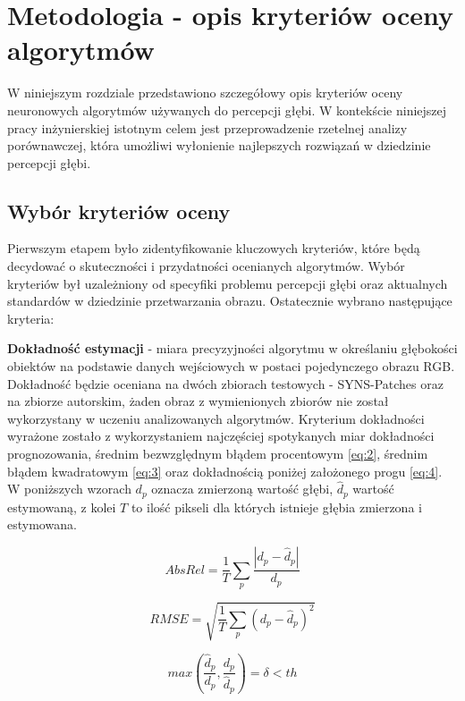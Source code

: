 \chapter{Metodologia - opis kryteriów oceny algorytmów}\label{chap:metodologia}

W niniejszym rozdziale przedstawiono szczegółowy opis kryteriów oceny neuronowych algorytmów używanych do percepcji głębi. W kontekście niniejszej pracy inżynierskiej istotnym celem jest przeprowadzenie rzetelnej analizy porównawczej, która umożliwi wyłonienie najlepszych rozwiązań w dziedzinie percepcji głębi.

\section{Wybór kryteriów oceny}
Pierwszym etapem było zidentyfikowanie kluczowych kryteriów, które będą decydować o skuteczności i przydatności ocenianych algorytmów. Wybór kryteriów był uzależniony od specyfiki problemu percepcji głębi oraz aktualnych standardów w dziedzinie przetwarzania obrazu. Ostatecznie wybrano następujące kryteria:

\textbf{Dokładność estymacji} - miara precyzyjności algorytmu w określaniu głębokości obiektów na podstawie danych wejściowych w postaci pojedynczego obrazu RGB. Dokładność będzie oceniana na dwóch zbiorach testowych - SYNS-Patches oraz na zbiorze autorskim, żaden obraz z wymienionych zbiorów nie został wykorzystany w uczeniu analizowanych algorytmów. Kryterium dokładności wyrażone zostało z wykorzystaniem najczęściej spotykanych miar dokładności prognozowania, średnim bezwzględnym błądem procentowym \ref{eq:2}, średnim błądem kwadratowym \ref{eq:3} oraz dokładnością poniżej założonego progu \ref{eq:4}. W poniższych wzorach $ d_p $ oznacza zmierzoną wartość głębi, $ \hat{d}_p $ wartość estymowaną, z kolei $ T $ to ilość pikseli dla których istnieje głębia zmierzona i estymowana.

\begin{equation} \label{eq:2}
    AbsRel = \frac{1}{T} \sum_{p} \frac{|d_p - \hat{d}_p|}{d_p}
\end{equation}

\begin{equation} \label{eq:3}
    RMSE = \sqrt{\frac{1}{T} \sum_{p} (d_p - \hat{d}_p)^2}
\end{equation}

\begin{equation} \label{eq:4}
    max(\frac{\hat{d}_p}{d_p}, \frac{d_p}{\hat{d}_p}) = \delta < th
\end{equation}

